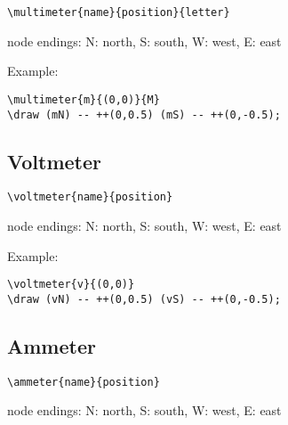 \documentclass[parskip=full]{scrartcl}
\begin{document}
\begin{verbatim}
\multimeter{name}{position}{letter}
\end{verbatim}
node endings: N: north, S: south, W: west, E: east

Example:\\
\begin{minipage}{0.8\textwidth}
\begin{verbatim}
\multimeter{m}{(0,0)}{M}
\draw (mN) -- ++(0,0.5) (mS) -- ++(0,-0.5);
\end{verbatim}
\end{minipage}
\begin{minipage}{0.19\textwidth}
\end{minipage}

\subsection{Voltmeter}

\begin{verbatim}
\voltmeter{name}{position}
\end{verbatim}
node endings: N: north, S: south, W: west, E: east

Example:\\
\begin{minipage}{0.8\textwidth}
\begin{verbatim}
\voltmeter{v}{(0,0)}
\draw (vN) -- ++(0,0.5) (vS) -- ++(0,-0.5);
\end{verbatim}
\end{minipage}
\begin{minipage}{0.19\textwidth}
\end{minipage}

\subsection{Ammeter}

\begin{verbatim}
\ammeter{name}{position}
\end{verbatim}
node endings: N: north, S: south, W: west, E: east
\end{document}

